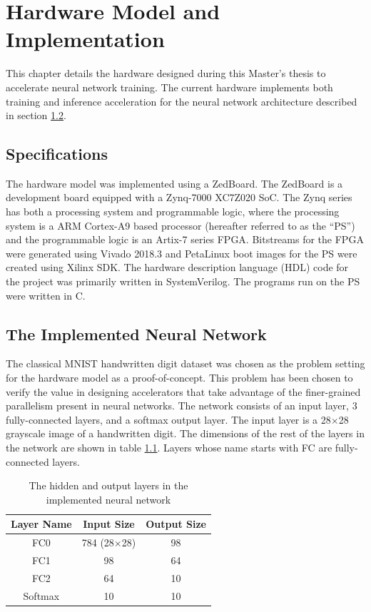 \chapter{Hardware Model and Implementation}

This chapter details the hardware designed during this Master's thesis to accelerate neural network training. The current hardware implements both training and inference acceleration for the neural network architecture described in section \ref{net-arch}.
\section{Specifications}
The hardware model was implemented using a ZedBoard. The ZedBoard is a development board equipped with a Zynq-7000 XC7Z020 SoC. The Zynq series has both a processing system and programmable logic, where the processing system is a ARM Cortex-A9 based processor (hereafter referred to as the ``PS'') and the programmable logic is an Artix-7 series FPGA. Bitstreams for the FPGA were generated using Vivado 2018.3 and PetaLinux boot images for the PS were created using Xilinx SDK. The hardware description language (HDL) code for the project was primarily written in SystemVerilog. The programs run on the PS were written in C.

\section{The Implemented Neural Network}\label{net-arch}
The classical MNIST handwritten digit dataset was chosen as the problem setting for the hardware model as a proof-of-concept. This problem has been chosen to verify the value in designing accelerators that take advantage of the finer-grained parallelism present in neural networks. The network consists of an input layer, 3 fully-connected layers, and a softmax output layer. The input layer is a 28$\times$28 grayscale image of a handwritten digit. The dimensions of the rest of the layers in the network are shown in table \ref{net-arch-table}. Layers whose name starts with FC are fully-connected layers.
 
\begin{table}
	\centering
	\begin{tabular}{|c| c| c|}
		\hline
		\textbf{Layer Name}	& \textbf{Input Size} & \textbf{Output Size}\\\hline
		FC0	& 784 (28$\times$28) & 98 \\\hline
		FC1 & 98 & 64 \\\hline
		FC2 & 64 & 10 \\\hline
		Softmax & 10 & 10\\\hline
	\end{tabular}
	\caption{The hidden and output layers in the implemented neural network}
	\label{net-arch-table}
\end{table}

